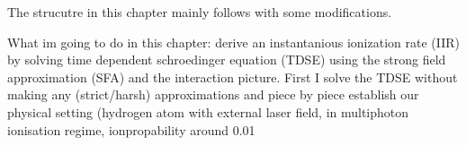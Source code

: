

The strucutre in this chapter mainly follows \cite{Ivanov20012005} with some modifications.

What im going to do in this chapter: derive an instantanious ionization rate (IIR) by solving time dependent schroedinger equation (TDSE) using the strong field approximation (SFA) and the interaction picture.
First I solve the TDSE without making any (strict/harsh) approximations and piece by piece establish our physical setting (hydrogen atom with external laser field, in multiphoton ionisation regime, ionpropability around 0.01%


